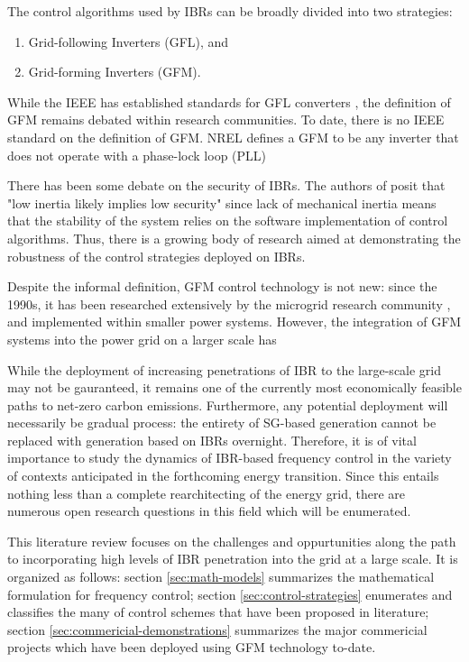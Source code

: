 The control algorithms used by IBRs can be broadly divided into two strategies:
\begin{enumerate}
  \item Grid-following Inverters (GFL), and
  \item Grid-forming Inverters (GFM).
\end{enumerate}

While the IEEE has established standards for GFL converters \cite{photovoltaics_ieee_2018},
the definition of GFM remains debated within research communities.
To date, there is no IEEE standard on the definition of GFM.
NREL defines a GFM to be any inverter that does not operate with a phase-lock loop (PLL)
\cite{lin_research_2020}

There has been some debate on the security of IBRs. The authors
of \cite{milano_foundations_2018}
posit that "low inertia likely implies low security" since
lack of mechanical inertia means that the stability of the system
relies on the software implementation of control algorithms. Thus,
there is a growing body of research aimed at demonstrating the 
robustness of the control strategies deployed on IBRs.

Despite the informal definition, GFM control technology is
not new: since the 1990s, it has been researched extensively by
the microgrid research community \cite{lin_research_2020},
and implemented within smaller power systems. However, the 
integration of GFM systems into the power grid on a larger scale
has 

While the deployment of increasing penetrations of IBR to the large-scale
grid may not be gauranteed, it remains one of the currently most 
economically feasible paths to net-zero carbon emissions. Furthermore,
any potential deployment will necessarily be gradual process: the entirety of
SG-based generation cannot be replaced with generation based on IBRs
overnight. Therefore, it is of vital importance to study the 
dynamics of IBR-based frequency control in the variety of contexts
anticipated in the forthcoming energy transition. Since this
entails nothing less than a complete rearchitecting of the energy
grid, there are numerous open research questions in this field
which will be enumerated.

This literature review focuses on the challenges and oppurtunities along
the path to incorporating high levels of IBR penetration into the grid 
at a large scale. It is organized as follows: section \ref{sec:math-models}
summarizes the mathematical formulation for frequency control; section
\ref{sec:control-strategies} enumerates and classifies the many
of control schemes that have been proposed in literature; section
\ref{sec:commericial-demonstrations} summarizes the major commericial
projects which have been deployed using GFM technology to-date.


